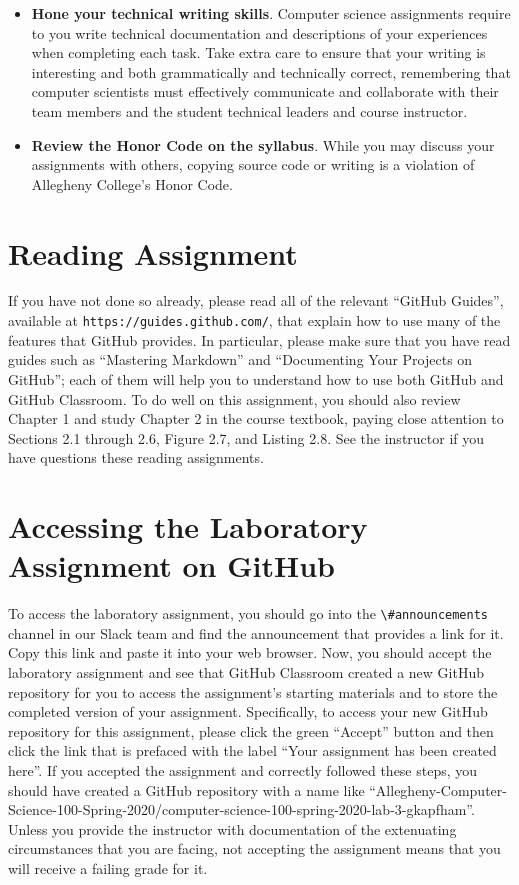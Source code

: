 \documentclass[11pt]{article}
\newcommand{\url}[1]{\lstinline{#1}}
\newcommand{\channel}[1]{\lstinline{#1}}
\begin{document}
\begin{itemize}
\item {\bf Hone your technical writing skills}. Computer science assignments
  require to you write technical documentation and descriptions of your
  experiences when completing each task. Take extra care to ensure that your
  writing is interesting and both grammatically and technically correct,
  remembering that computer scientists must effectively communicate and
  collaborate with their team members and the student technical leaders and
  course instructor.

\item {\bf Review the Honor Code on the syllabus}. While you may discuss your
  assignments with others, copying source code or writing is a violation of
  Allegheny College's Honor Code.

\end{itemize}

\section*{Reading Assignment}

If you have not done so already, please read all of the relevant ``GitHub
Guides'', available at \url{https://guides.github.com/}, that explain how to use
many of the features that GitHub provides. In particular, please make sure that
you have read guides such as ``Mastering Markdown'' and ``Documenting Your
Projects on GitHub''; each of them will help you to understand how to use both
GitHub and GitHub Classroom. To do well on this assignment, you should also
review Chapter 1 and study Chapter 2 in the course textbook, paying close
attention to Sections 2.1 through 2.6, Figure 2.7, and Listing 2.8. See the
instructor if you have questions these reading assignments.

\section*{Accessing the Laboratory Assignment on GitHub}

To access the laboratory assignment, you should go into the
\channel{\#announcements} channel in our Slack team and find the announcement
that provides a link for it. Copy this link and paste it into your web browser.
Now, you should accept the laboratory assignment and see that GitHub Classroom
created a new GitHub repository for you to access the assignment's starting
materials and to store the completed version of your assignment. Specifically,
to access your new GitHub repository for this assignment, please click the
green ``Accept'' button and then click the link that is prefaced with the label
``Your assignment has been created here''. If you accepted the assignment and
correctly followed these steps, you should have created a GitHub repository
with a name like
``Allegheny-Computer-Science-100-Spring-2020/computer-science-100-spring-2020-lab-3-gkapfham''.
Unless you provide the instructor with documentation of the extenuating
circumstances that you are facing, not accepting the assignment means that you
will receive a failing grade for it.
\end{document}
